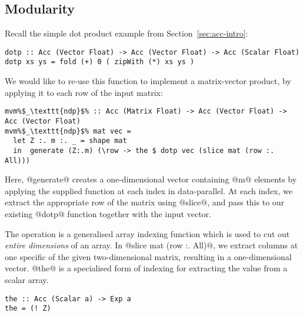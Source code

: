\subsection{Modularity}
\label{sec:problem_1}

Recall the simple dot product example from Section~\ref{sec:acc-intro}:
%
\begin{lstlisting}
dotp :: Acc (Vector Float) -> Acc (Vector Float) -> Acc (Scalar Float)
dotp xs ys = fold (+) 0 ( zipWith (*) xs ys )
\end{lstlisting}
%

We would like to re-use this function to implement a matrix-vector product, by applying it to each row of the input matrix:
%
\begin{lstlisting}
mvm%$_\texttt{ndp}$% :: Acc (Matrix Float) -> Acc (Vector Float) -> Acc (Vector Float)
mvm%$_\texttt{ndp}$% mat vec =
  let Z :. m :. _ = shape mat
  in  generate (Z:.m) (\row -> the $ dotp vec (slice mat (row :. All)))
\end{lstlisting}
%
Here, @generate@ creates a one-dimensional vector containing @m@ elements by applying the supplied function at each index in data-parallel. At each index, we
extract the appropriate row of the matrix using @slice@, and pass this to our existing @dotp@ function together with the input vector.

The  operation is a generalised array indexing function which is used to cut out \emph{entire dimensions} of an array. In @slice mat (row :. All)@,
we extract  columns at one specific  of the given
two-dimensional matrix, resulting in a one-dimensional vector. @the@ is a specialised form of indexing for extracting the value from a scalar array.
%
\begin{lstlisting}
the :: Acc (Scalar a) -> Exp a
the = (! Z)
\end{lstlisting}
%

